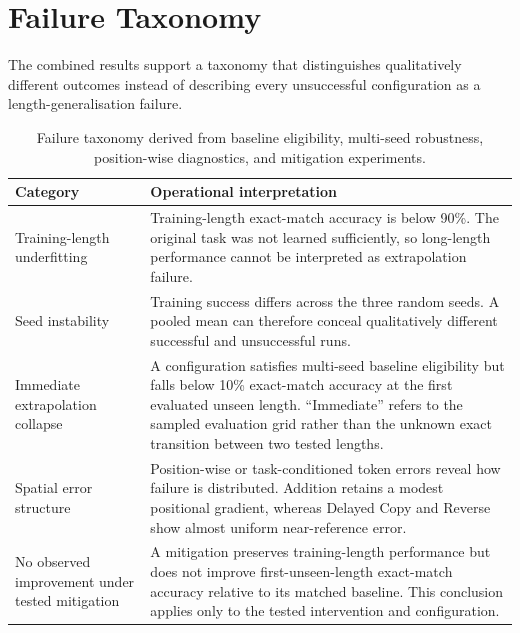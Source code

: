 \documentclass[
    author={Aanchala Ravindra Bhongade},
    supervisor={Dr. Fernando Moreno-Pino},
    degree={MSc},
    title={Length Generalisation in Transformer-Based Sequence Models: Failure Taxonomy and Mitigation Strategies},
    subtitle={},
    type={},
    year={2026}
]{dissertation}
\begin{document}
\section{Failure Taxonomy}
\label{sec:failure-taxonomy}

The combined results support a taxonomy that distinguishes qualitatively different outcomes instead of describing every unsuccessful configuration as a length-generalisation failure.

\begin{table}[htbp]
\centering
\small
\begin{tabular}{p{3.8cm}p{9.0cm}}
\hline
Category & Operational interpretation \\
\hline
Training-length underfitting
& Training-length exact-match accuracy is below 90\%. The original task was not learned sufficiently, so long-length performance cannot be interpreted as extrapolation failure. \\

Seed instability
& Training success differs across the three random seeds. A pooled mean can therefore conceal qualitatively different successful and unsuccessful runs. \\

Immediate extrapolation collapse
& A configuration satisfies multi-seed baseline eligibility but falls below 10\% exact-match accuracy at the first evaluated unseen length. ``Immediate''
refers to the sampled evaluation grid rather than the unknown exact transition between two tested lengths. \\

Spatial error structure
& Position-wise or task-conditioned token errors reveal how failure is distributed. Addition retains a modest positional gradient, whereas Delayed Copy and Reverse show almost uniform near-reference error. \\

No observed improvement under tested mitigation
& A mitigation preserves training-length performance but does not improve first-unseen-length exact-match accuracy relative to its matched baseline.
This conclusion applies only to the tested intervention and configuration. \\
\hline
\end{tabular}
\caption{Failure taxonomy derived from baseline eligibility, multi-seed robustness, position-wise diagnostics, and mitigation experiments.}
\label{tab:failure-taxonomy}
\end{table}
\end{document}
